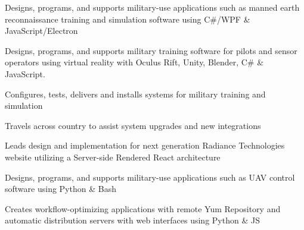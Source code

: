 \documentclass[]{resume}
\begin{document}
\begin{minipage}[t]{0.74\textwidth}
\begin{tightemize}
\item Designs, programs, and supports military-use applications such as manned earth reconnaissance training and simulation software using C\#/WPF \& JavaScript/Electron
\item Designs, programs, and supports military training software for pilots and sensor operators using virtual reality with Oculus Rift, Unity, Blender, C\# \& JavaScript.
\item Configures, tests, delivers and installs systems for military training and simulation
\item Travels across country to assist system upgrades and new integrations
\item Leads design and implementation for next generation Radiance Technologies website utilizing a Server-side Rendered React architecture
\end{tightemize}

\sectionsep

\begin{tightemize}
\item Designs, programs, and supports military-use applications such as UAV control software using Python \& Bash
\item Creates workflow-optimizing applications with remote Yum Repository and automatic distribution servers with web interfaces using Python \& JS
\end{tightemize}

\sectionsep



\end{minipage}
\end{document}
